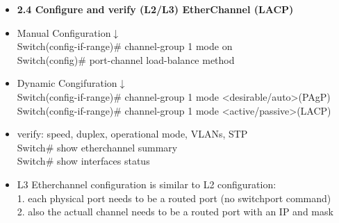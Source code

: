 \documentclass{article}
\begin{document}
\begin{itemize}
  \item \textbf{2.4 Configure and verify (L2/L3) EtherChannel (LACP)}
	\item[] Manual Configuration$\downarrow$\\
		Switch(config-if-range)\# channel-group 1 mode on\\
		Switch(config)\# port-channel load-balance method
	\item[] Dynamic Congifuration$\downarrow$\\
		Switch(config-if-range)\# channel-group 1 mode \textless desirable/auto\textgreater (PAgP)\\
		Switch(config-if-range)\# channel-group 1 mode \textless active/passive\textgreater (LACP)
	\item[] verify: speed, duplex, operational mode, VLANs, STP\\
		Switch\# show etherchannel summary\\
		Switch\# show interfaces status
	\item[] L3 Etherchannel configuration is similar to L2 configuration:\\
		1. each physical port needs to be a routed port (no switchport command)\\
		2. also the actuall channel needs to be a routed port with an IP and mask\\
  

\end{itemize}
\end{document}

